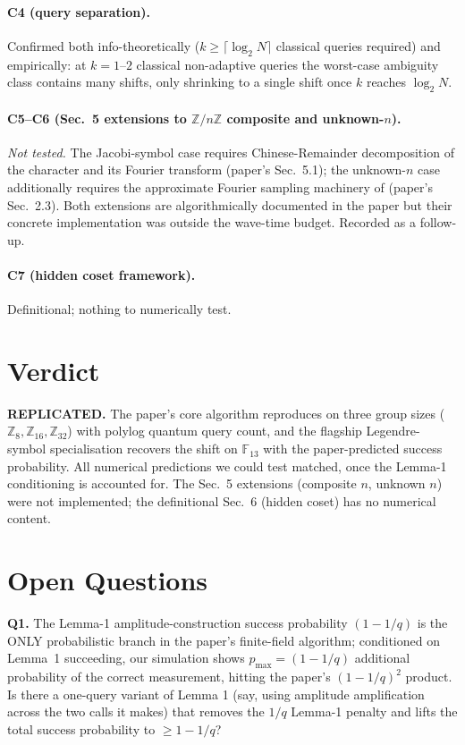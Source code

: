 \documentclass[11pt]{article}
\begin{document}
\paragraph{C4 (query separation).}
Confirmed both info-theoretically ($k \ge \lceil\log_2 N\rceil$
classical queries required) and empirically: at $k=1$--$2$ classical
non-adaptive queries the worst-case ambiguity class contains many
shifts, only shrinking to a single shift once $k$ reaches $\log_2 N$.

\paragraph{C5--C6 (Sec.~5 extensions to $\mathbb{Z}/n\mathbb{Z}$
composite and unknown-$n$).}
\emph{Not tested.}  The Jacobi-symbol case requires Chinese-Remainder
decomposition of the character and its Fourier transform (paper's
Sec.~5.1); the unknown-$n$ case additionally requires the approximate
Fourier sampling machinery of \cite{HH00} (paper's Sec.~2.3).  Both
extensions are algorithmically documented in the paper but their
concrete implementation was outside the wave-time budget.  Recorded
as a follow-up.

\paragraph{C7 (hidden coset framework).}
Definitional; nothing to numerically test.

\section{Verdict}

\textbf{REPLICATED.}  The paper's core algorithm reproduces on three
group sizes ($\mathbb{Z}_8, \mathbb{Z}_{16}, \mathbb{Z}_{32}$) with
polylog quantum query count, and the flagship Legendre-symbol
specialisation recovers the shift on $\mathbb{F}_{13}$ with the
paper-predicted success probability.  All numerical predictions we
could test matched, once the Lemma-1 conditioning is accounted for.
The Sec.~5 extensions (composite $n$, unknown $n$) were not
implemented; the definitional Sec.~6 (hidden coset) has no numerical
content.

\section*{Open Questions}

\textbf{Q1.} The Lemma-1 amplitude-construction success probability
$(1-1/q)$ is the ONLY probabilistic branch in the paper's finite-field
algorithm; conditioned on Lemma~1 succeeding, our simulation shows
$p_{\max} = (1-1/q)$ additional probability of the correct
measurement, hitting the paper's $(1-1/q)^2$ product.  Is there a
one-query variant of Lemma 1 (say, using amplitude amplification
across the two calls it makes) that removes the $1/q$ Lemma-1
penalty and lifts the total success probability to $\ge 1-1/q$?
\end{document}
